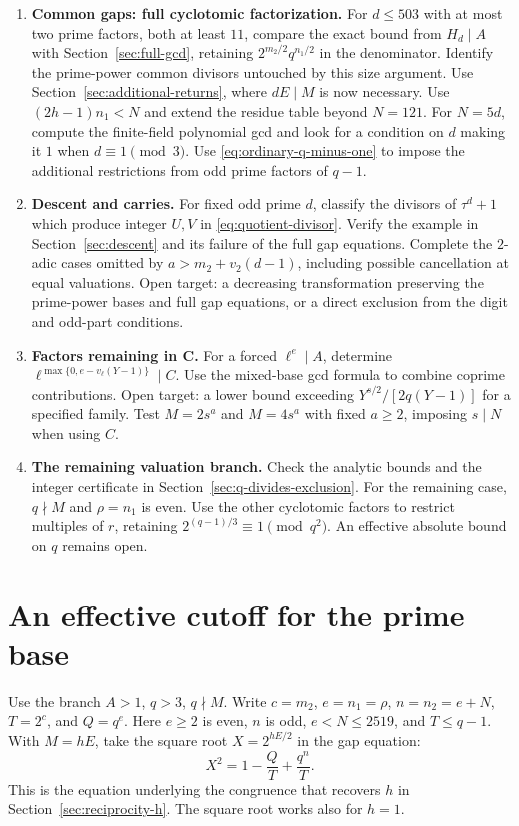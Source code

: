 \documentclass[11pt]{article}
\begin{document}
\begin{enumerate}
\item \textbf{Common gaps: full cyclotomic factorization.}
For $d\le503$ with at most two prime factors, both at least $11$,
compare the exact bound from $H_d\mid A$ with
Section~\ref{sec:full-gcd}, retaining $2^{m_2/2}q^{n_1/2}$ in the
denominator. Identify the prime-power common divisors untouched by
this size argument.
Use Section~\ref{sec:additional-returns}, where $dE\mid M$ is now
necessary. Use $(2h-1)n_1<N$ and extend the residue table beyond
$N=121$. For $N=5d$, compute the finite-field polynomial gcd and
look for a condition on $d$ making it $1$ when $d\equiv1\pmod3$.
Use \eqref{eq:ordinary-q-minus-one} to impose
the additional restrictions from odd prime factors of $q-1$.

\item \textbf{Descent and carries.}
For fixed odd prime $d$, classify the divisors of $\tau^d+1$ which
produce integer $U,V$ in \eqref{eq:quotient-divisor}. Verify the example
in Section~\ref{sec:descent} and its failure of the full gap equations.
Complete the $2$-adic cases omitted by $a>m_2+v_2(d-1)$, including
possible cancellation at equal valuations. Open target: a decreasing
transformation preserving the prime-power bases and full gap equations,
or a direct exclusion from the digit and odd-part conditions.

\item \textbf{Factors remaining in C.}
For a forced $\ell^e\mid A$, determine
$\ell^{\max\{0,e-v_\ell(Y-1)\}}\mid C$.
Use the mixed-base gcd formula to combine coprime contributions.
Open target: a lower bound exceeding $Y^{s/2}/[2q(Y-1)]$ for a
specified family. Test $M=2s^a$ and $M=4s^a$ with fixed $a\geq2$,
imposing $s\mid N$ when using $C$.

\item \textbf{The remaining valuation branch.}
Check the analytic bounds and the integer certificate in
Section~\ref{sec:q-divides-exclusion}. For the remaining case,
$q\nmid M$ and $\rho=n_1$ is even. Use the other cyclotomic factors
to restrict multiples of $r$, retaining
$2^{(q-1)/3}\equiv1\pmod{q^2}$. An effective absolute bound on $q$ remains open.
\end{enumerate}


\section{An effective cutoff for the prime base}
\label{sec:effective-q-cutoff}

Use the branch $A>1$, $q>3$, $q\nmid M$. Write $c=m_2$, $e=n_1=\rho$,
$n=n_2=e+N$, $T=2^c$, and $Q=q^e$. Here $e\ge2$ is even, $n$ is odd,
$e<N\le2519$, and $T\le q-1$. With $M=hE$, take the square root
$X=2^{hE/2}$ in the gap equation:
\[
X^2=1-\frac{Q}{T}+\frac{q^n}{T}.
\]
This is the equation underlying the congruence that recovers $h$
in Section~\ref{sec:reciprocity-h}. The square root works also for $h=1$.
\end{document}
